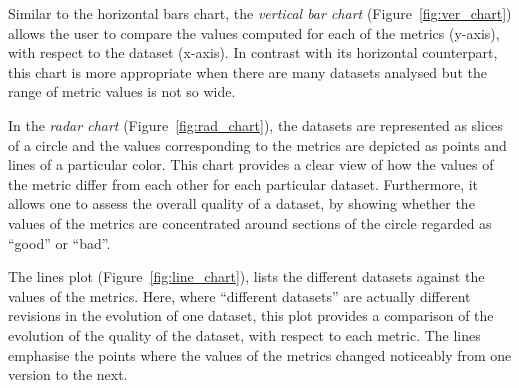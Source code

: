 Similar to the horizontal bars chart, the \emph{vertical bar chart} (Figure~\ref{fig:ver_chart}) allows the user to compare the values computed for each of the metrics (y-axis), with respect to the dataset (x-axis).
In contrast with its horizontal counterpart, this chart is more appropriate when there are many datasets analysed but the range of metric values is not so wide.

In the \emph{radar chart} (Figure~\ref{fig:rad_chart}), the datasets are represented as slices of a circle and the values corresponding to the metrics are depicted as points and lines of a particular color.
This chart provides a clear view of how the values of the metric differ from each other for each particular dataset. 
Furthermore, it allows one to assess the overall quality of a dataset, by showing whether the values of the metrics are concentrated around sections of the circle regarded as “good” or “bad”.

The lines plot (Figure~\ref{fig:line_chart}), lists the different datasets against the values of the metrics.
Here, where “different datasets” are actually different revisions in the evolution of one dataset, this plot provides a comparison of the evolution of the quality of the dataset, with respect to each metric.
The lines emphasise the points where the values of the metrics changed noticeably from one version to the next.

